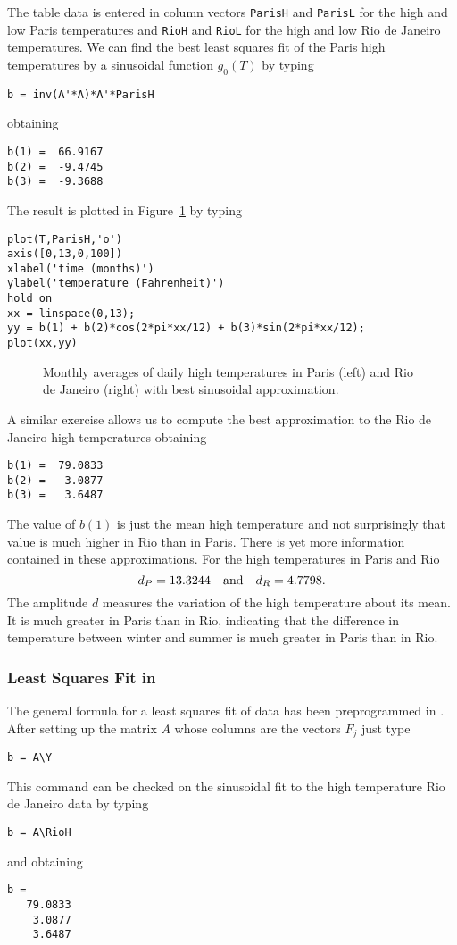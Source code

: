 \documentclass{ximera}
\begin{document}
The table data is entered in column vectors {\tt ParisH} and {\tt ParisL} for
the high and low Paris temperatures and {\tt RioH} and {\tt RioL} for the
high and low Rio de Janeiro temperatures.  We can find the best least squares
fit of the Paris high temperatures by a sinusoidal function $g_0(T)$ by typing
\begin{verbatim}
b = inv(A'*A)*A'*ParisH
\end{verbatim}
obtaining
\begin{verbatim}
b(1) =  66.9167
b(2) =  -9.4745
b(3) =  -9.3688
\end{verbatim}
The result is plotted in Figure~\ref{F:ParisH} by typing
\begin{verbatim}
plot(T,ParisH,'o')
axis([0,13,0,100])
xlabel('time (months)')
ylabel('temperature (Fahrenheit)')
hold on
xx = linspace(0,13);
yy = b(1) + b(2)*cos(2*pi*xx/12) + b(3)*sin(2*pi*xx/12);
plot(xx,yy)
\end{verbatim}

\begin{figure}[htb]
     \centerline{%
     }
     \caption{Monthly averages of daily high temperatures in Paris (left) and
	Rio de Janeiro (right) with best sinusoidal approximation.}
     \label{F:ParisH}
\end{figure}

A similar exercise allows us to compute the best approximation to the
Rio de Janeiro high temperatures obtaining
\begin{verbatim}
b(1) =  79.0833
b(2) =   3.0877
b(3) =   3.6487
\end{verbatim}
The value of $b(1)$ is just the mean high temperature and not surprisingly
that value is much higher in Rio than in Paris.  There is yet more
information contained in these approximations.   For
the high temperatures in Paris and Rio
\[
d_P = 13.3244 \quad\mbox{and}\quad d_R = 4.7798.
\]
The amplitude $d$ measures the variation of the high temperature about its
mean.  It is much greater in Paris than in Rio, indicating that the
difference in temperature between winter and summer is much greater in Paris
than in Rio.

\subsubsection*{Least Squares Fit in \Matlabp}

The general formula for a least squares fit of data  has been
preprogrammed in \Matlabp.  After setting up the matrix $A$ whose columns are 
the vectors $F_j$ just type
\begin{verbatim}
b = A\Y
\end{verbatim}
This \Matlab command can be checked on the sinusoidal fit to the high 
temperature Rio de Janeiro data by typing
\begin{verbatim}
b = A\RioH
\end{verbatim} 
and obtaining
\begin{verbatim}
b =
   79.0833
    3.0877
    3.6487
\end{verbatim}
\end{document}
